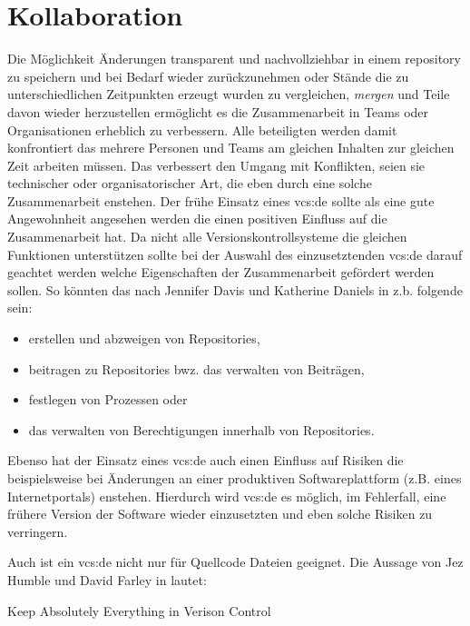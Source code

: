 \section{Kollaboration}
Die Möglichkeit Änderungen transparent und nachvollziehbar in einem
\gls{repository} zu speichern und bei Bedarf wieder zurückzunehmen oder Stände
die zu unterschiedlichen Zeitpunkten erzeugt wurden zu vergleichen,
\textit{\glqq{}mergen\grqq{}} und Teile davon wieder herzustellen ermöglicht es
die Zusammenarbeit in Teams oder Organisationen erheblich zu verbessern. Alle
beteiligten werden damit konfrontiert das mehrere Personen und Teams am
gleichen Inhalten zur gleichen Zeit arbeiten müssen. Das verbessert den Umgang
mit Konflikten, seien sie technischer oder organisatorischer Art, die eben
durch eine solche Zusammenarbeit enstehen. Der frühe Einsatz eines
\acrlong{vcs:de} sollte als eine gute Angewohnheit angesehen werden die einen
positiven Einfluss auf die Zusammenarbeit hat. Da nicht alle
Versionskontrollsysteme die gleichen Funktionen unterstützen sollte bei der
Auswahl des einzusetztenden \acrlong{vcs:de} darauf geachtet werden welche
Eigenschaften der Zusammenarbeit gefördert werden sollen. So könnten das nach
Jennifer Davis und Katherine Daniels in \cite[S.~178]{effdo} z.b. folgende sein:

\begin{itemize}
\item erstellen und abzweigen von Repositories,
\item beitragen zu Repositories bwz. das verwalten von Beiträgen,
\item festlegen von Prozessen oder
\item das verwalten von Berechtigungen innerhalb von Repositories.
\end{itemize}

Ebenso hat der Einsatz eines \acrlong{vcs:de} auch einen Einfluss auf Risiken
die beispielsweise bei Änderungen an einer produktiven Softwareplattform (z.B.
eines Internetportals) enstehen. Hierdurch wird \acrlong{vcs:de} es möglich, im
Fehlerfall, eine frühere Version der Software wieder einzusetzten und eben
solche Risiken zu verringern.\cite[S.~178]{effdo}

Auch ist ein \acrlong{vcs:de} nicht nur für Quellcode Dateien geeignet. Die
Aussage von Jez Humble und David Farley in \cite[S.~33]{cd} lautet:

\begin{center}
\glqq{}Keep Absolutely Everything in Verison Control\grqq{}
\end{center}


